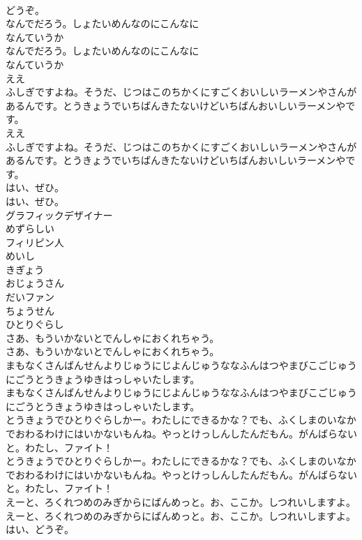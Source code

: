 \documentclass[8pt]{extreport}
\begin{document}
\begin{CJK}{UTF8}{min}
\\	どうぞ。 
\\	なんでだろう。しょたいめんなのにこんなに
\\	なんていうか
\\	なんでだろう。しょたいめんなのにこんなに
\\	なんていうか
\\	ええ
\\	ふしぎですよね。そうだ、じつはこのちかくにすごくおいしいラーメンやさんがあるんです。とうきょうでいちばんきたないけどいちばんおいしいラーメンやです。	
\\	ええ
\\	ふしぎですよね。そうだ、じつはこのちかくにすごくおいしいラーメンやさんがあるんです。とうきょうでいちばんきたないけどいちばんおいしいラーメンやです。 
\\	はい、ぜひ。	
\\	はい、ぜひ。 
\\	グラフィックデザイナー
\\	めずらしい
\\	フィリピン人
\\	めいし
\\	きぎょう
\\	おじょうさん
\\	だいファン
\\	ちょうせん
\\	ひとりぐらし
\\	さあ、もういかないとでんしゃにおくれちゃう。	
\\	さあ、もういかないとでんしゃにおくれちゃう。 
\\	まもなくさんばんせんよりじゅうにじよんじゅうななふんはつやまびこごじゅうにごうとうきょうゆきはっしゃいたします。	
\\	まもなくさんばんせんよりじゅうにじよんじゅうななふんはつやまびこごじゅうにごうとうきょうゆきはっしゃいたします。 
\\	とうきょうでひとりぐらしかー。わたしにできるかな？でも、ふくしまのいなかでおわるわけにはいかないもんね。やっとけっしんしたんだもん。がんばらないと。わたし、ファイト！	
\\	とうきょうでひとりぐらしかー。わたしにできるかな？でも、ふくしまのいなかでおわるわけにはいかないもんね。やっとけっしんしたんだもん。がんばらないと。わたし、ファイト！ 
\\	えーと、ろくれつめのみぎからにばんめっと。お、ここか。しつれいしますよ。	
\\	えーと、ろくれつめのみぎからにばんめっと。お、ここか。しつれいしますよ。 
\\	はい、どうぞ。	

\end{CJK}
\end{document}
